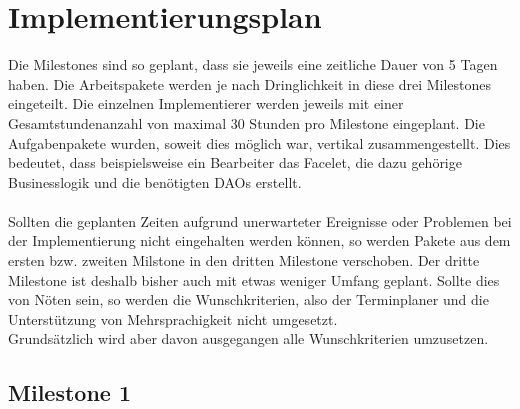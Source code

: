 \newcommand{\kursiv}[1]{{\it #1}}
\chapter{Implementierungsplan}
Die Milestones sind so geplant, dass sie jeweils eine zeitliche Dauer von 5 Tagen haben. Die Arbeitspakete werden
je nach Dringlichkeit in diese drei Milestones eingeteilt. Die einzelnen Implementierer werden jeweils
mit einer Gesamtstundenanzahl von maximal 30 Stunden pro Milestone eingeplant. Die Aufgabenpakete wurden, soweit dies möglich war, vertikal zusammengestellt.
Dies bedeutet, dass beispielsweise ein Bearbeiter das Facelet, die dazu
gehörige Businesslogik und die benötigten DAOs erstellt.\\
\ \\
Sollten die geplanten Zeiten aufgrund unerwarteter Ereignisse oder Problemen bei der Implementierung nicht eingehalten werden können, so werden Pakete aus dem
ersten bzw. zweiten Milstone in den dritten Milestone verschoben. Der dritte Milestone ist deshalb bisher auch mit etwas weniger Umfang geplant.
Sollte dies von Nöten sein, so werden die Wunschkriterien, also der Terminplaner und die Unterstützung von Mehrsprachigkeit nicht umgesetzt.\\
Grundsätzlich wird aber davon ausgegangen alle Wunschkriterien umzusetzen.
\section{Milestone 1}

